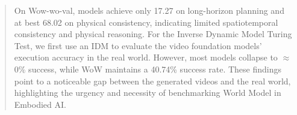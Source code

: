 \begin{abstract}
On Wow-wo-val, models achieve only 17.27 on long-horizon planning and at best 68.02 on physical consistency, indicating limited spatiotemporal consistency and physical reasoning. For the Inverse Dynamic Model Turing Test, we first use an IDM to evaluate the video foundation models' execution accuracy in the real world. However, most models collapse to $\approx$ 0\% success, while WoW maintains a 40.74\% success rate. These findings point to a noticeable gap between the generated videos and the real world, highlighting the urgency and necessity of benchmarking World Model in Embodied AI.
\end{abstract}
 
